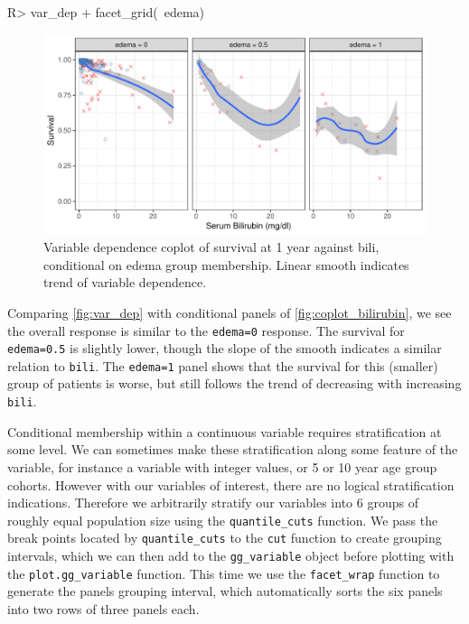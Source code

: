 \documentclass[article, nojss]{jss}
\begin{document}
\begin{Schunk}
\begin{Sinput}
R> var_dep + facet_grid(~edema)
\end{Sinput}
\begin{figure}[!htb]

{\centering \includegraphics{rfs-coplot_bilirubin-1}

}

\caption[Variable dependence coplot of survival at 1 year against bili, conditional on edema group membership]{Variable dependence coplot of survival at 1 year against bili, conditional on edema group membership. Linear smooth indicates trend of variable dependence.}\label{fig:coplot_bilirubin}
\end{figure}
\end{Schunk}

Comparing \autoref{fig:var_dep} with conditional panels of
\autoref{fig:coplot_bilirubin}, we see the overall response is similar
to the \texttt{edema=0} response. The survival for \texttt{edema=0.5} is
slightly lower, though the slope of the smooth indicates a similar
relation to \texttt{bili}. The \texttt{edema=1} panel shows that the
survival for this (smaller) group of patients is worse, but still
follows the trend of decreasing with increasing \texttt{bili}.

Conditional membership within a continuous variable requires
stratification at some level. We can sometimes make these stratification
along some feature of the variable, for instance a variable with integer
values, or 5 or 10 year age group cohorts. However with our variables of
interest, there are no logical stratification indications. Therefore we
arbitrarily stratify our variables into 6 groups of roughly equal
population size using the \texttt{quantile\_cuts} function. We pass the
break points located by \texttt{quantile\_cuts} to the \texttt{cut}
function to create grouping intervals, which we can then add to the
\texttt{gg\_variable} object before plotting with the
\texttt{plot.gg\_variable} function. This time we use the
\texttt{facet\_wrap} function to generate the panels grouping interval,
which automatically sorts the six panels into two rows of three panels
each.
\end{document}
